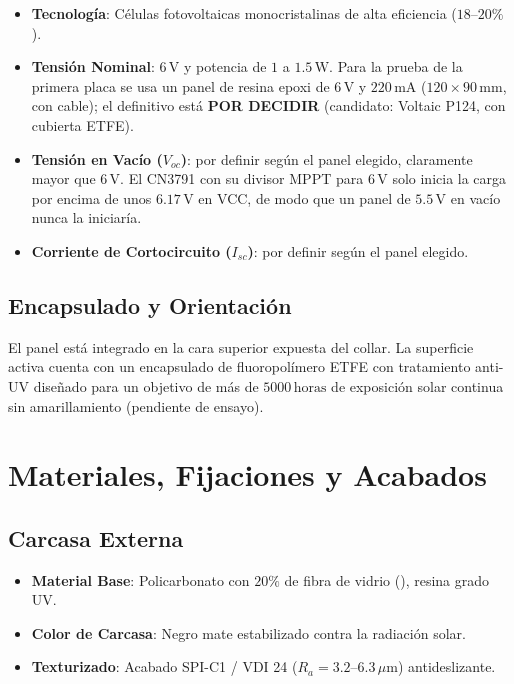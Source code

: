 \begin{itemize}[leftmargin=*]
    \item \textbf{Tecnología}: Células fotovoltaicas monocristalinas de alta eficiencia ($18\text{--}20\%$).
    \item \textbf{Tensión Nominal}: $6\,\text{V}$ y potencia de $1$ a $1.5\,\text{W}$. Para la prueba de la primera placa se usa un panel de resina epoxi de $6\,\text{V}$ y $220\,\text{mA}$ ($120\times90\,\text{mm}$, con cable); el definitivo está \textbf{POR DECIDIR} (candidato: Voltaic P124, con cubierta ETFE).
    \item \textbf{Tensión en Vacío ($V_{oc}$)}: por definir según el panel elegido, claramente mayor que $6\,\text{V}$. El CN3791 con su divisor MPPT para $6\,\text{V}$ solo inicia la carga por encima de unos $6.17\,\text{V}$ en VCC, de modo que un panel de $5.5\,\text{V}$ en vacío nunca la iniciaría.
    \item \textbf{Corriente de Cortocircuito ($I_{sc}$)}: por definir según el panel elegido.
\end{itemize}

\subsection{Encapsulado y Orientación}

El panel está integrado en la cara superior expuesta del collar. La superficie activa cuenta con un encapsulado de fluoropolímero ETFE con tratamiento anti-UV diseñado para un objetivo de más de $5000\,\text{horas}$ de exposición solar continua sin amarillamiento (pendiente de ensayo).

\section{Materiales, Fijaciones y Acabados}

\subsection{Carcasa Externa}

\begin{itemize}[leftmargin=*]
    \item \textbf{Material Base}: Policarbonato con $20\%$ de fibra de vidrio (), resina grado UV.
    \item \textbf{Color de Carcasa}: Negro mate estabilizado contra la radiación solar.
    \item \textbf{Texturizado}: Acabado SPI-C1 / VDI 24 ($R_a = 3.2\text{--}6.3\,\mu\text{m}$) antideslizante.
\end{itemize}

